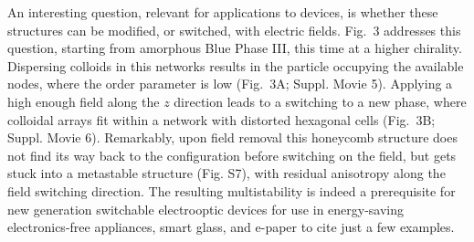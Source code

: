 \documentclass[12pt]{article}
\begin{document}
An interesting question, relevant for applications to devices, is whether 
these structures can be modified, or switched, with electric fields.
Fig.~3 addresses this question, starting from amorphous Blue Phase III,
this time at a higher chirality. Dispersing colloids in this networks
results in the particle occupying the available nodes, where the order
parameter is low (Fig.~3A; Suppl. Movie 5). Applying a high enough field along the $z$ 
direction leads to a switching to a new phase, where colloidal arrays fit 
within a network with distorted hexagonal cells (Fig.~3B; Suppl. Movie 6). Remarkably, upon 
field removal this honeycomb structure does not find its way back to the 
configuration before switching on the field, but gets stuck into a metastable 
structure (Fig. S7), with residual anisotropy along the field switching 
direction.
The resulting multistability is indeed a prerequisite for new generation 
switchable electrooptic devices for use in energy-saving electronics-free
appliances, smart glass, and e-paper to cite just a few examples.

\fi
\end{document}
